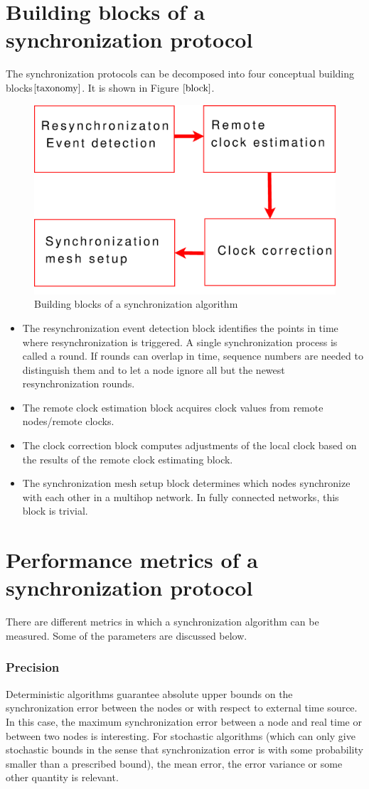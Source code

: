 \documentclass[a4paper,10pt]{report}
\begin{document}
\section{\textbf{Building blocks of a synchronization protocol}}
The synchronization protocols can be decomposed into four conceptual building blocks$\cite{taxonomy}$. It is shown in Figure
$\ref{block}$.
\begin{figure}[b]
 \centering
\includegraphics[width= 0.5 \textwidth]{buildingblock}
\caption{Building blocks of a synchronization algorithm}
\label{block}
\end{figure}
\begin{itemize}
\item The resynchronization event detection block identifies the points in time where resynchronization is triggered. A single synchronization process is called a round. If rounds can overlap in time, sequence numbers are needed to distinguish them and to let a node ignore all but the newest resynchronization rounds.
\item The remote clock estimation block acquires clock values from remote nodes/remote clocks.
\item The clock correction block computes adjustments of the local clock based on the results of the remote clock estimating block.
\item The synchronization mesh setup block determines which nodes synchronize with each other in a multihop network. In fully connected networks, this block is trivial.
\end{itemize}
\section{\textbf{Performance metrics of a synchronization protocol}}
There are different metrics in which a synchronization algorithm can be measured. Some of the parameters are discussed below.
\subsubsection{\textbf{Precision}}
Deterministic algorithms guarantee absolute upper bounds on the
synchronization error between the nodes or with respect to external
time source. In this case, the maximum synchronization error between
a node and real time or between two nodes is interesting. For
stochastic algorithms (which can only give stochastic bounds in the
sense that synchronization error is with some probability smaller
than a prescribed bound), the mean error, the error variance or some
other quantity is relevant.
\end{document}
